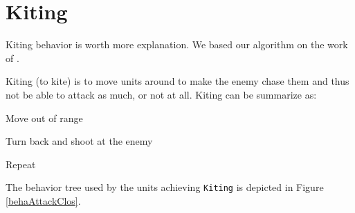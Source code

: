 \section{Kiting}

Kiting behavior is worth more explanation. 
We based our algorithm on the work of \cite{kiting}. 

\begin{definition}[Kiting]
    Kiting (to kite) is to move units around to make the enemy chase them and thus not be able to attack as much, or not at all. 
    Kiting can be summarize as:
    \begin{shortitem}
    \item Move out of range
    \item Turn back and shoot at the enemy
    \item Repeat
    \end{shortitem}
\end{definition}

The behavior tree used by the units achieving \texttt{Kiting} is depicted in Figure \ref{behaAttackClos}.


